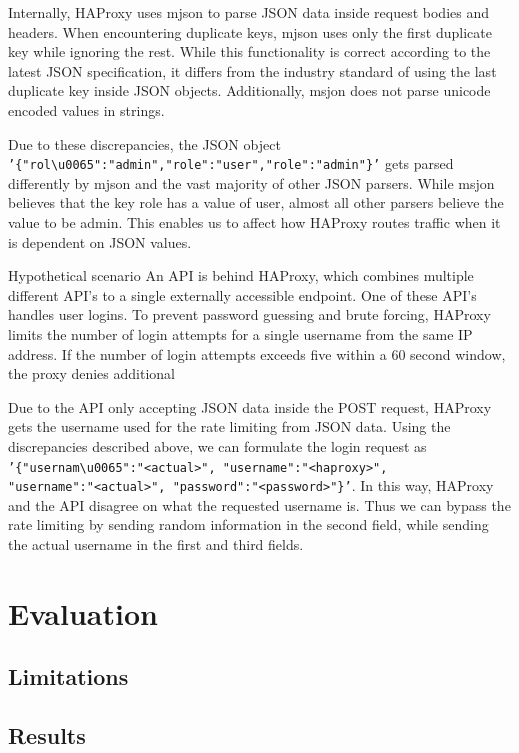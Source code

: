 \documentclass[english, 12pt, a4paper, sci, utf8, a-2b, online]{aaltothesis}
\def\str#1{\texttt{'#1'}}
\begin{document}
Internally, HAProxy uses mjson to parse JSON data inside request bodies and headers. When encountering duplicate keys, mjson uses only the first duplicate key while ignoring the rest. While this functionality is correct according to the latest JSON specification, it differs from the industry standard of using the last duplicate key inside JSON objects. Additionally, msjon does not parse unicode encoded values in strings.

Due to these discrepancies, the JSON object \\
\str{\{"rol\textbackslash u0065":"admin","role":"user","role":"admin"\}} gets parsed differently by mjson and the vast majority of other JSON parsers. While msjon believes that the key role has a value of user, almost all other parsers believe the value to be admin. This enables us to affect how HAProxy routes traffic when it is dependent on JSON values.

Hypothetical scenario
An API is behind HAProxy, which combines multiple different API's to a single externally accessible endpoint. One of these API's handles user logins. To prevent password guessing and brute forcing, HAProxy limits the number of login attempts for a single username from the same IP address. If the number of login attempts exceeds five within a 60 second window, the proxy denies additional 

Due to the API only accepting JSON data inside the POST request, HAProxy gets the username used for the rate limiting from JSON data.
Using the discrepancies described above, we can formulate the login request as \\ \str{\{"usernam\textbackslash u0065":"<actual>", "username":"<haproxy>",\\ "username":"<actual>", "password":"<password>"\}}. In this way, HAProxy and the API disagree on what the requested username is. Thus we can bypass the rate limiting by sending random information in the second field, while sending the actual username in the first and third fields.

\clearpage


\section{Evaluation}
\subsection{Limitations}
\subsection{Results}
\end{document}
